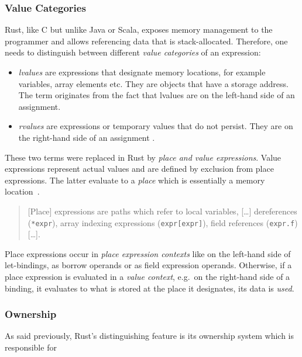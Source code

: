 \subsubsection{Value Categories}

Rust, like C but unlike Java or Scala, exposes memory management to the
programmer and allows referencing data that is stack-allocated. Therefore,  one
needs to distinguish between different \emph{value categories} of an expression:

\begin{itemize}
\tightlist
\item
  \emph{lvalues} are expressions that designate memory locations, for
  example variables, array elements etc. They are objects that have a
  storage address. The term originates from the fact that lvalues are on
  the left-hand side of an assignment.
\item
  \emph{rvalues} are expressions or temporary values that do not
  persist. They are on the right-hand side of an assignment \cite{wiki:lvalues}.
\end{itemize}

These two terms were replaced in Rust by \emph{place and value expressions}.
Value expressions represent actual values and are defined by exclusion from
place expressions. The latter evaluate to a \emph{place} which is essentially a
memory location~\cite{rustref}.

\begin{quote}
{[}Place{]} expressions are paths which refer to local variables,
{[}\ldots{]} dereferences (\passthrough{\lstinline!*expr!}), array
indexing expressions (\passthrough{\lstinline!expr[expr]!}), field
references (\passthrough{\lstinline!expr.f!}) {[}\ldots{]}. \\
\cite[section ``Expressions'']{rustref}
\end{quote}

Place expressions occur in \emph{place expression contexts} like on the
left-hand side of let-bindings, as borrow operands or as field expression
operands. Otherwise, if a place expression is evaluated in a \emph{value
context}, e.g.~on the right-hand side of a binding, it evaluates to what is
stored at the place it designates, its data is \emph{used}.

\subsubsection{Ownership}

As said previously, Rust's distinguishing feature is its ownership system which
is responsible for

